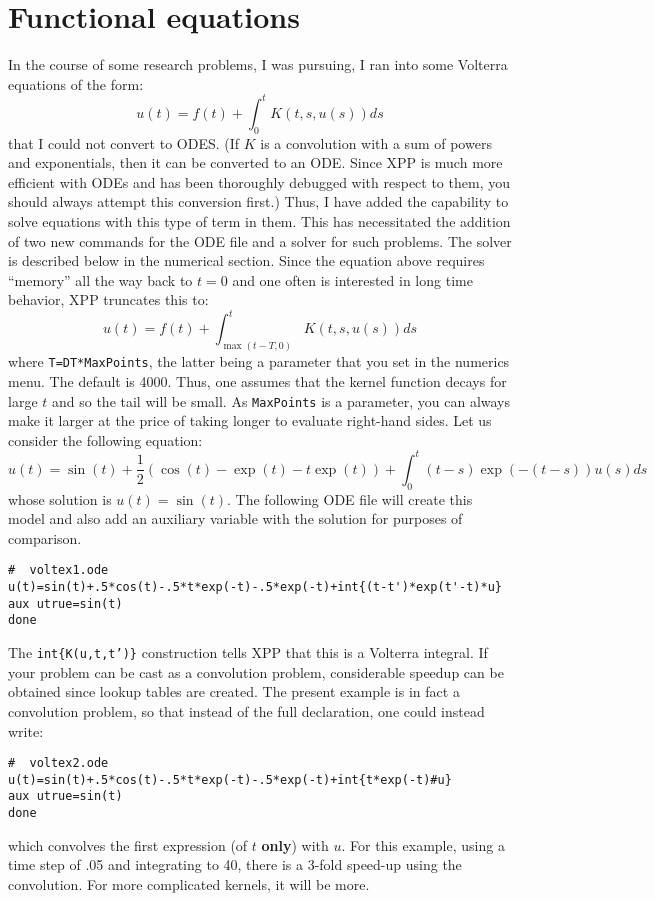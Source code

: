 \documentclass{article}
\begin{document}
\section{Functional equations}
In the course of some research problems, I was pursuing, I ran into
some Volterra equations of the form:
\[
	u(t)=f(t)+\int_0^t K(t,s,u(s))ds
\]
that I could not convert to ODES.  (If $K$ is a convolution with a 
sum of powers and
exponentials, then it can be converted to an ODE.  Since XPP is much
more efficient with ODEs and has been thoroughly debugged with respect
to them, you should always attempt this conversion first.)  Thus, I
have added the capability to solve equations with this type of term in
them.  This has necessitated the addition of two new commands for the
ODE file and a solver for such problems. The solver is
described below in the numerical section.  Since the equation above
requires ``memory'' all the way back to $t=0$ and one often is
interested in long time behavior, XPP truncates this to:
\[
	u(t)=f(t)+\int_{\max(t-T,0)}^t K(t,s,u(s))ds
\]
where {\tt T=DT*MaxPoints}, the latter being a parameter that you
set in the numerics menu.  The default is 4000.  Thus, one
assumes that the kernel function decays for large $t$ and so the tail
will be small.  As {\tt MaxPoints} is a parameter, you can always make
it larger at the price of taking longer to evaluate right-hand sides.
Let us consider
the following equation:
\[
 u(t) = \sin(t)+\frac{1}{2}(\cos(t)-\exp(t)-t\exp(t))+\int_0^t
(t-s)\exp(-(t-s))u(s)ds
\]
whose solution is $u(t)=\sin(t).$  The following ODE file will create
this model and also add an auxiliary variable with the solution for
purposes of comparison.
\begin{verbatim}
#  voltex1.ode
u(t)=sin(t)+.5*cos(t)-.5*t*exp(-t)-.5*exp(-t)+int{(t-t')*exp(t'-t)*u}
aux utrue=sin(t)
done
\end{verbatim}
The {\tt int\{K(u,t,t')\}} construction tells XPP that this is a
Volterra integral. If your problem can be
cast as a convolution problem, considerable speedup can be obtained
since lookup tables are created.  The present example is
in fact a convolution problem, so that instead of the full
declaration, one could instead write:
\begin{verbatim}
#  voltex2.ode
u(t)=sin(t)+.5*cos(t)-.5*t*exp(-t)-.5*exp(-t)+int{t*exp(-t)#u}
aux utrue=sin(t)
done
\end{verbatim}
which convolves the first expression (of $t$ {\bf only}) with $u.$ For
this example, using a time step of .05 and integrating to 40, there is
a 3-fold speed-up using the convolution.  For more complicated
kernels, it will be more.  
\end{document}
